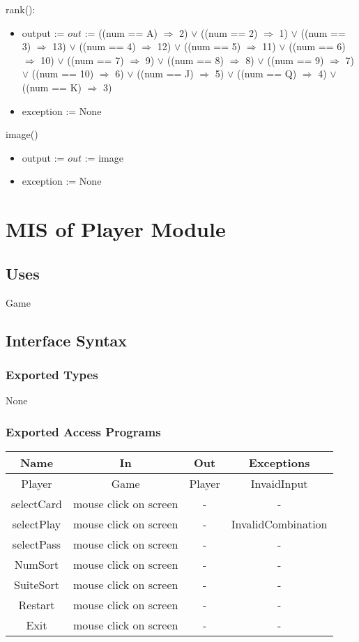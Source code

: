 \documentclass[12pt, titlepage]{article}
\begin{document}
rank():
\begin{itemize}
    \item output := $out$ := ((num == A) $\Rightarrow$ 2) $\lor$ ((num == 2) $\Rightarrow$ 1) $\lor$ ((num == 3) $\Rightarrow$ 13) $\lor$ ((num == 4) $\Rightarrow$ 12) $\lor$ ((num == 5) $\Rightarrow$ 11) $\lor$ ((num == 6) $\Rightarrow$ 10) $\lor$ ((num == 7) $\Rightarrow$ 9) $\lor$ ((num == 8) $\Rightarrow$ 8) $\lor$ ((num == 9) $\Rightarrow$ 7) $\lor$ ((num == 10) $\Rightarrow$ 6) $\lor$ ((num == J) $\Rightarrow$ 5) $\lor$ ((num == Q) $\Rightarrow$ 4) $\lor$ ((num == K) $\Rightarrow$ 3)
    \item exception := None
\end{itemize}

image()
\begin{itemize}
    \item output := $out$ := image
    \item exception := None
\end{itemize}

\section{MIS of Player Module}
\subsection{Uses}
Game
\subsection{Interface Syntax}
\subsubsection{Exported Types}
None
\subsubsection{Exported Access Programs}
{\begin{tabular}[pos]{|c|c|c|c|}
\hline
\textbf{Name}& \textbf{In} & \textbf{Out} & \textbf{Exceptions} \\ \hline
Player & Game & Player & InvaidInput\\ 
\hline
selectCard & mouse click on screen &- &- \\ 
\hline
selectPlay & mouse click on screen & - & InvalidCombination \\ 
\hline
selectPass & mouse click on screen & - & - \\ 
\hline
NumSort & mouse click on screen & - &- \\ 
\hline
SuiteSort & mouse click on screen & - & - \\ 
\hline
Restart & mouse click on screen & - & - \\ 
\hline
Exit & mouse click on screen & - & - \\ 
\hline
\end{tabular}
}
\end{document}

